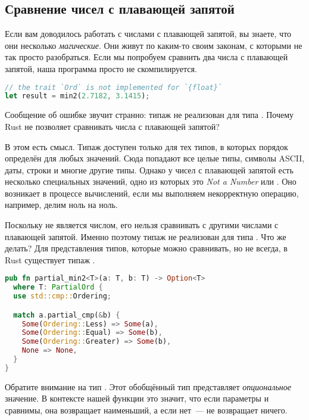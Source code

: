 \subsection{Сравнение чисел с плавающей запятой}

Если вам доводилось работать с числами с плавающей запятой, вы знаете, что они несколько {\em магические}.
Они живут по каким-то своим законам, с которыми не так просто разобраться.
Если мы попробуем сравнить два числа с плавающей запятой, наша программа просто не скомпилируется.

\begin{lstlisting}[language=Rust]
// the trait `Ord` is not implemented for `{float}`
let result = min2(2.7182, 3.1415);
\end{lstlisting}

Сообщение об ошибке звучит странно: типаж  не реализован для типа .
Почему Rust не позволяет сравнивать числа с плавающей запятой?

В этом есть смысл. Типаж  доступен только для тех типов, в которых порядок определён для любых значений.
Сюда попадают все целые типы, символы ASCII, даты, строки и многие другие типы.
Однако у чисел с плавающей запятой есть несколько специальных значений, одно из которых это {\em Not a Number} или .
Оно возникает в процессе вычислений, если мы выполняем некорректную операцию, например, делим ноль на ноль.

Поскольку  не является числом, его нельзя сравнивать с другими числами с плавающей запятой.
Именно поэтому типаж  не реализован для типа .
Что же делать?
Для представления типов, которые можно сравнивать, но не всегда, в Rust существует типаж .

\begin{lstlisting}[language=Rust]
pub fn partial_min2<T>(a: T, b: T) -> Option<T>
  where T: PartialOrd {
  use std::cmp::Ordering;

  match a.partial_cmp(&b) {
    Some(Ordering::Less) => Some(a),
    Some(Ordering::Equal) => Some(b),
    Some(Ordering::Greater) => Some(b),
    None => None,
  }
}
\end{lstlisting}

Обратите внимание на тип .
Этот обобщённый тип представляет {\em опциональное} значение.
В контексте нашей функции это значит, что если параметры  и  сравнимы, она возвращает наименьший, а если нет~--- не возвращает ничего.

